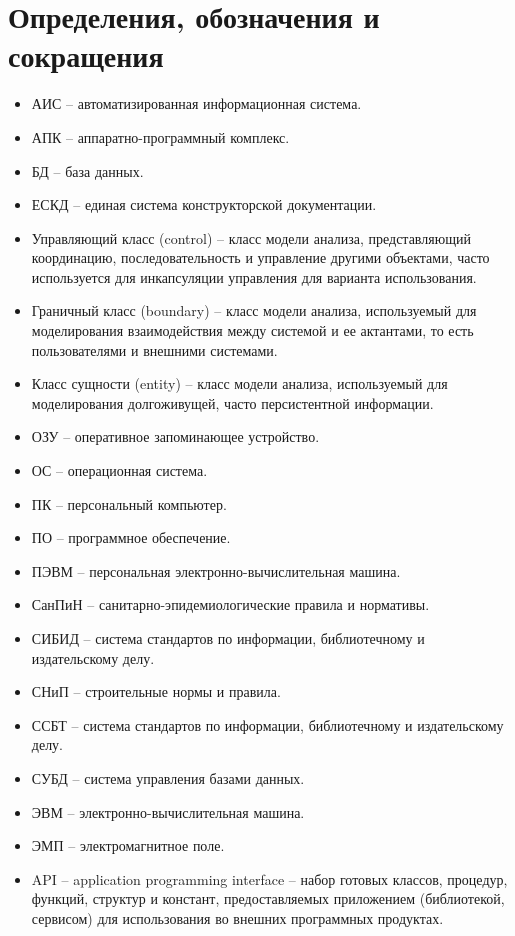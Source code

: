 \section*{Определения, обозначения и сокращения}

\begin{itemize}
\item АИС -- автоматизированная информационная система.
\item АПК -- аппаратно-программный комплекс.
\item БД -- база данных.
\item ЕСКД -- единая система конструкторской документации.
\item Управляющий класс (control) -- класс модели анализа, представляющий координацию, последовательность и управление другими объектами, часто используется для инкапсуляции управления для варианта использования.
\item Граничный класс (boundary) -- класс модели анализа, используемый для моделирования взаимодействия между системой и ее актантами, то есть пользователями и внешними системами.
\item Класс сущности (entity) -- класс модели анализа, используемый для моделирования долгоживущей, часто персистентной информации.
\item ОЗУ -- оперативное запоминающее устройство.
\item ОС -- операционная система.
\item ПК -- персональный компьютер.
\item ПО -- программное обеспечение.
\item ПЭВМ -- персональная электронно-вычислительная машина.
\item СанПиН -- санитарно-эпидемиологические правила и нормативы.
\item СИБИД -- система стандартов по информации, библиотечному и издательскому делу.
\item СНиП -- строительные нормы и правила. 
\item ССБТ -- система стандартов по информации, библиотечному и издательскому делу.
\item СУБД -- система управления базами данных.
\item ЭВМ -- электронно-вычислительная машина.
\item ЭМП -- электромагнитное поле.
\item API -- application programming interface -- набор готовых классов, процедур, функций, структур и констант, предоставляемых приложением (библиотекой, сервисом) для использования во внешних программных продуктах.

\end{itemize}
